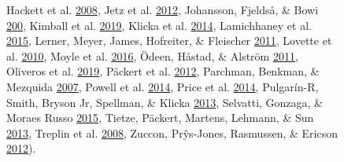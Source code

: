 \begin{figure}[!h]
{Hackett et al. \protect\hyperlink{ref-hackett2008phylogenomic}{2008},
Jetz et al. \protect\hyperlink{ref-Jetz2012}{2012},
Johansson, Fjeldså, \& Bowi \protect\hyperlink{ref-johansson2008phylogenetic}{200},
Kimball et al. \protect\hyperlink{ref-kimball2019phylogenomic}{2019},
Klicka et al. \protect\hyperlink{ref-klicka2014comprehensive}{2014},
Lamichhaney et al. \protect\hyperlink{ref-lamichhaney2015evolution}{2015},
Lerner, Meyer, James, Hofreiter, \& Fleischer \protect\hyperlink{ref-lerner2011multilocus}{2011},
Lovette et al. \protect\hyperlink{ref-lovette2010comprehensive}{2010},
Moyle et al. \protect\hyperlink{ref-moyle2016tectonic}{2016},
Ödeen, Håstad, \& Alström \protect\hyperlink{ref-odeen2011evolution}{2011},
Oliveros et al. \protect\hyperlink{ref-oliveros2019earth}{2019},
Päckert et al. \protect\hyperlink{ref-packert2012horizontal}{2012},
Parchman, Benkman, \& Mezquida \protect\hyperlink{ref-parchman2007coevolution}{2007},
Powell et al. \protect\hyperlink{ref-powell2014comprehensive}{2014},
Price et al. \protect\hyperlink{ref-price2014niche}{2014},
Pulgarín-R, Smith, Bryson Jr, Spellman, \& Klicka \protect\hyperlink{ref-pulgarin2013multilocus}{2013},
Selvatti, Gonzaga, \& Moraes Russo \protect\hyperlink{ref-selvatti2015paleogene}{2015},
Tietze, Päckert, Martens, Lehmann, \& Sun \protect\hyperlink{ref-tietze2013complete}{2013},
Treplin et al. \protect\hyperlink{ref-treplin2008molecular}{2008},
Zuccon, Prŷs-Jones, Rasmussen, \& Ericson \protect\hyperlink{ref-zuccon2012phylogenetic}{2012}).
}
\label{fig:fringillidae-topologies}
\end{figure}


